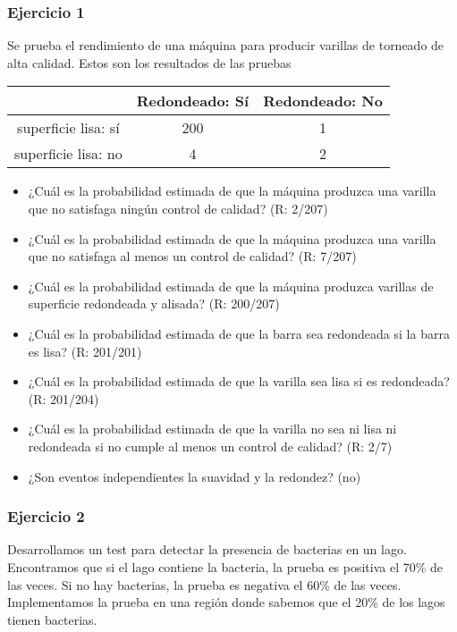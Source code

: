\documentclass[
]{book}
\begin{document}
\hypertarget{ejercicio-1-2}{%
\subsubsection{Ejercicio 1}\label{ejercicio-1-2}}

Se prueba el rendimiento de una máquina para producir varillas de torneado de alta calidad. Estos son los resultados de las pruebas

\begin{longtable}[]{@{}ccc@{}}
\toprule
& Redondeado: Sí & Redondeado: No \\
\midrule
\endhead
superficie lisa: sí & 200 & 1 \\
superficie lisa: no & 4 & 2 \\
\bottomrule
\end{longtable}

\begin{itemize}
\item
  ¿Cuál es la probabilidad estimada de que la máquina produzca una varilla que no satisfaga ningún control de calidad? (R: 2/207)
\item
  ¿Cuál es la probabilidad estimada de que la máquina produzca una varilla que no satisfaga al menos un control de calidad? (R: 7/207)
\item
  ¿Cuál es la probabilidad estimada de que la máquina produzca varillas de superficie redondeada y alisada? (R: 200/207)
\item
  ¿Cuál es la probabilidad estimada de que la barra sea redondeada si la barra es lisa? (R: 201/201)
\item
  ¿Cuál es la probabilidad estimada de que la varilla sea lisa si es redondeada? (R: 201/204)
\item
  ¿Cuál es la probabilidad estimada de que la varilla no sea ni lisa ni redondeada si no cumple al menos un control de calidad? (R: 2/7)
\item
  ¿Son eventos independientes la suavidad y la redondez? (no)
\end{itemize}

\hypertarget{ejercicio-2-2}{%
\subsubsection{Ejercicio 2}\label{ejercicio-2-2}}

Desarrollamos un test para detectar la presencia de bacterias en un lago. Encontramos que si el lago contiene la bacteria, la prueba es positiva el 70\% de las veces. Si no hay bacterias, la prueba es negativa el 60\% de las veces. Implementamos la prueba en una región donde sabemos que el 20\% de los lagos tienen bacterias.
\end{document}
